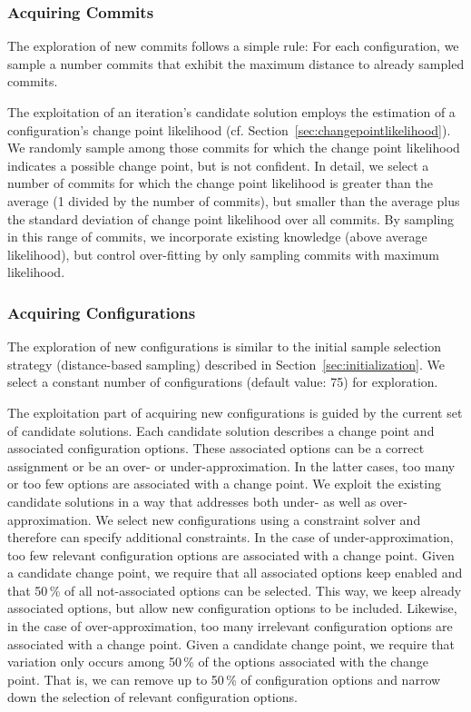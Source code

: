 \documentclass[sigconf]{acmart}
\begin{document}
	\subsubsection{Acquiring Commits}
	The exploration of new commits follows a simple rule: For each configuration, we sample a number commits that exhibit the maximum distance to already sampled commits. 
	
	The exploitation of an iteration's candidate solution employs the estimation of a configuration's change point likelihood (cf. Section~\ref{sec:changepointlikelihood}). We randomly sample among those commits for which the change point likelihood indicates a possible change point, but is not confident. In detail, we select a number of commits for which the change point likelihood is greater than the average (1 divided by the number of commits), but smaller than the average plus the standard deviation of change point likelihood over all commits. By sampling in this range of commits, we incorporate existing knowledge (above average likelihood), but control over-fitting by only sampling commits with maximum likelihood.
	
	\subsubsection{Acquiring Configurations}
	The exploration of new configurations is similar to the initial sample selection strategy (distance-based sampling) described in Section~\ref{sec:initialization}. We select a constant number of configurations (default value: 75) for exploration. 
	
	The exploitation part of acquiring new configurations is guided by the current set of candidate solutions. Each candidate solution describes a change point and associated configuration options. These associated options can be a correct assignment or be an over- or under-approximation. In the latter cases, too many or too few options are associated with a change point. We exploit the existing candidate solutions in a way that addresses both under- as well as over-approximation. We select new configurations using a constraint solver and therefore can specify additional constraints. 
	In the case of under-approximation, too few relevant configuration options are associated with a change point. Given a candidate change point, we require that all associated options keep enabled and that 50\,\% of all not-associated options can be selected. This way, we keep already associated options, but allow new configuration options to be included. Likewise, in the case of over-approximation, too many irrelevant configuration options are associated with a change point. Given a candidate change point, we require that variation only occurs among 50\,\% of the options associated with the change point. That is, we can remove up to 50\,\% of configuration options and narrow down the selection of relevant configuration options.
	
\end{document}
